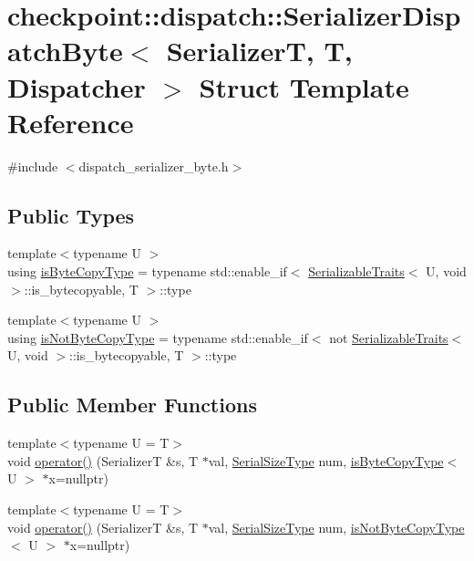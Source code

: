 \hypertarget{structcheckpoint_1_1dispatch_1_1_serializer_dispatch_byte}{}\section{checkpoint\+:\+:dispatch\+:\+:Serializer\+Dispatch\+Byte$<$ SerializerT, T, Dispatcher $>$ Struct Template Reference}
\label{structcheckpoint_1_1dispatch_1_1_serializer_dispatch_byte}


{\ttfamily \#include $<$dispatch\+\_\+serializer\+\_\+byte.\+h$>$}

\subsection*{Public Types}
\begin{DoxyCompactItemize}
\item 
{\footnotesize template$<$typename U $>$ }\\using \hyperlink{structcheckpoint_1_1dispatch_1_1_serializer_dispatch_byte_a6de610e1888790d04dbde87b243d7c7f}{is\+Byte\+Copy\+Type} = typename std\+::enable\+\_\+if$<$ \hyperlink{structcheckpoint_1_1_serializable_traits}{Serializable\+Traits}$<$ U, void $>$\+::is\+\_\+bytecopyable, T $>$\+::type
\item 
{\footnotesize template$<$typename U $>$ }\\using \hyperlink{structcheckpoint_1_1dispatch_1_1_serializer_dispatch_byte_ab1c9cd927c357c30c095356c44252ccd}{is\+Not\+Byte\+Copy\+Type} = typename std\+::enable\+\_\+if$<$ not \hyperlink{structcheckpoint_1_1_serializable_traits}{Serializable\+Traits}$<$ U, void $>$\+::is\+\_\+bytecopyable, T $>$\+::type
\end{DoxyCompactItemize}
\subsection*{Public Member Functions}
\begin{DoxyCompactItemize}
\item 
{\footnotesize template$<$typename U  = T$>$ }\\void \hyperlink{structcheckpoint_1_1dispatch_1_1_serializer_dispatch_byte_ab45639bcd8124d1057e074358f5ccc90}{operator()} (SerializerT \&s, T $\ast$val, \hyperlink{namespacecheckpoint_a083f6674da3f94c2901b18c6d238217c}{Serial\+Size\+Type} num, \hyperlink{structcheckpoint_1_1dispatch_1_1_serializer_dispatch_byte_a6de610e1888790d04dbde87b243d7c7f}{is\+Byte\+Copy\+Type}$<$ U $>$ $\ast$x=nullptr)
\item 
{\footnotesize template$<$typename U  = T$>$ }\\void \hyperlink{structcheckpoint_1_1dispatch_1_1_serializer_dispatch_byte_ae94c1edf6bab8281506605824c95b3b1}{operator()} (SerializerT \&s, T $\ast$val, \hyperlink{namespacecheckpoint_a083f6674da3f94c2901b18c6d238217c}{Serial\+Size\+Type} num, \hyperlink{structcheckpoint_1_1dispatch_1_1_serializer_dispatch_byte_ab1c9cd927c357c30c095356c44252ccd}{is\+Not\+Byte\+Copy\+Type}$<$ U $>$ $\ast$x=nullptr)
\end{DoxyCompactItemize}


